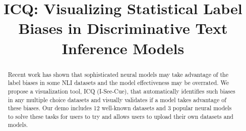 \documentclass{article}
\title{ICQ: Visualizing Statistical Label Biases in Discriminative Text Inference Models}
\newcommand{\KZ}[1]{\textcolor{blue}{Kenny: #1}}
\begin{document}
\maketitle

\begin{abstract}
Recent work has shown that sophisticated neural models may 
take advantage of the label biases in some NLI datasets and 
the model effectiveness may be overrated. 
We propose a visualization tool, ICQ (I-See-Cue), 
that automatically identifies such biases
in any multiple choice datasets and visually validates
if a model takes advantage of these biases.  Our demo includes 
12 well-known datasets and 3 popular neural models to solve
these tasks for users to try and allows users to upload their own
datasets and models.
\end{abstract}





%



\end{document}
